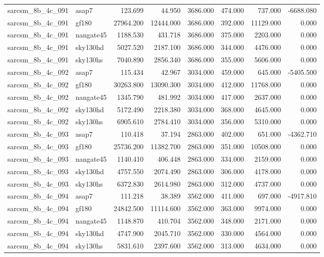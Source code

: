 \begin{tabular}{llrrrrrr}
sarcsm\_8b\_4c\_091 & asap7 & 123.699 & 44.950 & 3686.000 & 474.000 & 737.000 & -6688.080 \\
sarcsm\_8b\_4c\_091 & gf180 & 27964.200 & 12444.000 & 3686.000 & 392.000 & 11129.000 & 0.000 \\
sarcsm\_8b\_4c\_091 & nangate45 & 1188.530 & 431.718 & 3686.000 & 375.000 & 2203.000 & 0.000 \\
sarcsm\_8b\_4c\_091 & sky130hd & 5027.520 & 2187.100 & 3686.000 & 344.000 & 4476.000 & 0.000 \\
sarcsm\_8b\_4c\_091 & sky130hs & 7040.890 & 2856.340 & 3686.000 & 355.000 & 5606.000 & 0.000 \\
sarcsm\_8b\_4c\_092 & asap7 & 115.434 & 42.967 & 3034.000 & 459.000 & 645.000 & -5405.500 \\
sarcsm\_8b\_4c\_092 & gf180 & 30263.800 & 13090.300 & 3034.000 & 412.000 & 11768.000 & 0.000 \\
sarcsm\_8b\_4c\_092 & nangate45 & 1345.790 & 481.992 & 3034.000 & 417.000 & 2637.000 & 0.000 \\
sarcsm\_8b\_4c\_092 & sky130hd & 5172.490 & 2218.380 & 3034.000 & 368.000 & 4645.000 & 0.000 \\
sarcsm\_8b\_4c\_092 & sky130hs & 6905.610 & 2784.410 & 3034.000 & 356.000 & 5310.000 & 0.000 \\
sarcsm\_8b\_4c\_093 & asap7 & 110.418 & 37.194 & 2863.000 & 402.000 & 651.000 & -4362.710 \\
sarcsm\_8b\_4c\_093 & gf180 & 25736.200 & 11382.700 & 2863.000 & 351.000 & 10508.000 & 0.000 \\
sarcsm\_8b\_4c\_093 & nangate45 & 1140.410 & 406.448 & 2863.000 & 334.000 & 2159.000 & 0.000 \\
sarcsm\_8b\_4c\_093 & sky130hd & 4757.550 & 2074.490 & 2863.000 & 306.000 & 4178.000 & 0.000 \\
sarcsm\_8b\_4c\_093 & sky130hs & 6372.830 & 2614.980 & 2863.000 & 312.000 & 4737.000 & 0.000 \\
sarcsm\_8b\_4c\_094 & asap7 & 111.218 & 38.389 & 3562.000 & 411.000 & 697.000 & -4917.810 \\
sarcsm\_8b\_4c\_094 & gf180 & 24842.500 & 11114.600 & 3562.000 & 363.000 & 9974.000 & 0.000 \\
sarcsm\_8b\_4c\_094 & nangate45 & 1148.870 & 410.704 & 3562.000 & 348.000 & 2171.000 & 0.000 \\
sarcsm\_8b\_4c\_094 & sky130hd & 4747.900 & 2045.710 & 3562.000 & 330.000 & 4564.000 & 0.000 \\
sarcsm\_8b\_4c\_094 & sky130hs & 5831.610 & 2397.600 & 3562.000 & 313.000 & 4634.000 & 0.000 \\

\end{tabular}
